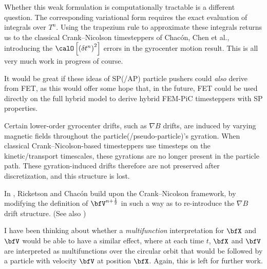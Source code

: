 \begin{remark}
        Whether this weak formulation is computationally tractable is a different question. The corresponding variational form requires the exact evaluation of integrals over $T^{n}$. Using the trapezium rule to approximate these integrals returns us to the classical Crank--Nicolson timesteppers of Chacón, Chen et al., introducing the $\calO\left[\left(\delta t^{n}\right)^{2}\right]$ errors in the gyrocenter motion result. This is all very much work in progress of course.

        It would be great if these ideas of SP(/AP) particle pushers could \emph{also} derive from FET, as this would offer some hope that, in the future, FET could be used directly on the full hybrid model to derive hybrid FEM-PiC timesteppers with SP properties.
    \end{remark}

    \begin{remark}
        Certain lower-order gyrocenter drifts, such as $\nabla B$ drifts, are induced by varying magnetic fields throughout the particle(/pseudo-particle)'s gyration. When classical Crank--Nicolson-based timesteppers use timesteps on the kinetic/transport timescales, these gyrations are no longer present in the particle path. These gyration-induced drifts therefore are not preserved after discretization, and this structure is lost.
        
        In \cite{Ricketson_Chacón_2020}, Ricketson and Chacón build upon the Crank--Nicolson framework, by modifying the definition of $\bfV^{n + \frac{1}{2}}$ in such a way as to re-introduce the $\nabla B$ drift structure. (See also \cite{Koshkarov_et_al_2022})

        I have been thinking about whether a \emph{multifunction} interpretation for $\bfX$ and $\bfV$ would be able to have a similar effect, where at each time $t$, $\bfX$ and $\bfV$ are interpreted as multifunctions over the circular orbit that would be followed by a particle with velocity $\bfV$ at position $\bfX$. Again, this is left for further work.
    \end{remark}
